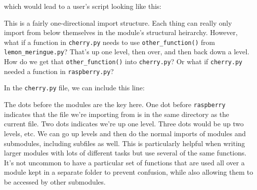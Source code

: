 which would lead to a user's script looking like this:

\begin{Shaded}
\begin{Highlighting}[]
\NormalTok{)}
\end{Highlighting}
\end{Shaded}

This is a fairly one-directional import structure. Each thing can really
only import from below themselves in the module's structural heirarchy.
However, what if a function in \texttt{cherry.py} needs to use
\texttt{other\_function()} from \texttt{lemon\_meringue.py}? That's up
one level, then over, and then back down a level. How do we get that
\texttt{other\_function()} into \texttt{cherry.py}? Or what if
\texttt{cherry.py} needed a function in \texttt{raspberry.py}?

In the \texttt{cherry.py} file, we can include this line:

\begin{Shaded}
\begin{Highlighting}[]
\end{Highlighting}
\end{Shaded}

The dots before the modules are the key here. One dot before
\texttt{raspberry} indicates that the file we're importing from is in
the same directory as the current file. Two dots indicates we're up one
level. Three dots would be up two levels, etc. We can go up levels and
then do the normal imports of modules and submodules, including subfiles
as well. This is particularly helpful when writing larger modules with
lots of different tasks but use several of the same functions. It's not
uncommon to have a particular set of functions that are used all over a
module kept in a separate folder to prevent confusion, while also
allowing them to be accessed by other submodules.
